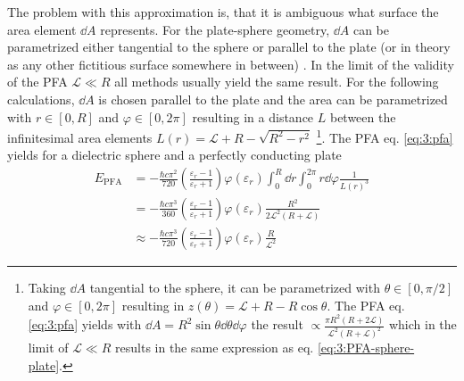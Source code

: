 The problem with this approximation is, that it is ambiguous what surface the area element $\dd A$ represents. For the plate-sphere geometry, $\dd A$ can be parametrized either tangential to the sphere or parallel to the plate (or in theory as any other fictitious surface somewhere in between) \cite{Bulgac_2006}.
In the limit of the validity of the PFA $\mathscr{L} \ll R$ all methods usually yield the same result.
For the following calculations, $\dd A$ is chosen parallel to the plate and the area can be parametrized with $r\in [0, R]$ and $\varphi \in [0, 2\pi]$ resulting in a distance $L$ between the infinitesimal area elements $L(r) = \mathscr{L} + R - \sqrt{R^2 - r^2}$ \footnote{Taking $\dd A$ tangential to the sphere, it can be parametrized with $\theta \in [0, \pi/2]$ and $\varphi \in [0, 2\pi]$ resulting in $z(\theta) = \mathscr{L} + R - R\cos\theta$. The PFA eq. \eqref{eq:3:pfa} yields with $\dd A = R^2\sin\theta\dd\theta\dd\varphi$ the result $\propto \frac{\pi R^2(R + 2\mathscr{L})}{\mathscr{L}^2(R+\mathscr{L})^2}$ which in the limit of $\mathscr{L} \ll R$ results in the same expression as eq. \eqref{eq:3:PFA-sphere-plate}.}. The PFA eq. \eqref{eq:3:pfa} yields for a dielectric sphere and a perfectly conducting plate
\begin{align}
  E_\mathrm{PFA} &= -\frac{\hbar c \pi^2}{720} \left(\frac{\varepsilon_r - 1}{\varepsilon_r + 1}\right) \varphi(\varepsilon_r) \int_0^R \dd r \int_0^{2\pi} r\dd \varphi \frac{1}{L(r)^3} \\
  &= -\frac{\hbar c \pi^3}{360} \left(\frac{\varepsilon_r - 1}{\varepsilon_r + 1}\right) \varphi(\varepsilon_r) \frac{R^2}{2\mathscr{L}^2(R + \mathscr{L})} \\
  &\approx -\frac{\hbar c \pi^3}{720} \left(\frac{\varepsilon_r - 1}{\varepsilon_r + 1}\right) \varphi(\varepsilon_r) \frac{R}{\mathscr{L}^2} \label{eq:3:PFA-sphere-plate}
\end{align}
